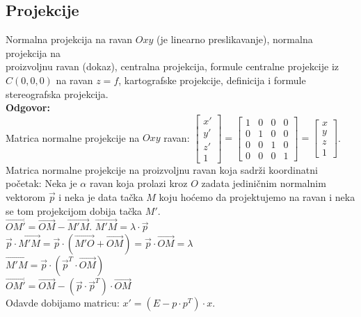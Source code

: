 \documentclass[12pt]{article}
\begin{document}
    \subsection{Projekcije}
    Normalna projekcija na ravan $Oxy$ (je linearno preslikavanje),
    normalna projekcija na \\proizvoljnu ravan (dokaz),
    centralna projekcija, formule centralne projekcije iz
$C(0,0,0)$ na ravan $z=f$, kartografske projekcije,
    definicija i formule stereografska projekcija.
    \\
    \textbf{Odgovor:}\\
    Matrica normalne projekcije na $Oxy$ ravan:
$\begin{bmatrix}
    x' \\
    y' \\
    z' \\
    1
\end{bmatrix}=\begin{bmatrix}
    1 & 0 & 0 & 0 \\
    0 & 1 & 0 & 0 \\
    0 & 0 & 1 & 0 \\
    0 & 0 & 0 & 1
\end{bmatrix}=\begin{bmatrix}
    x \\
    y \\
    z \\
    1
\end{bmatrix}$.\\
    Matrica normalne projekcije na proizvoljnu ravan koja sadrži koordinatni početak:
    Neka je $\alpha$ ravan koja prolazi kroz $O$ zadata jediničnim
    normalnim vektorom $\overrightarrow{p}$ i neka je data tačka $M$
    koju hoćemo da projektujemo na ravan i neka se
    tom projekcijom dobija tačka $M'$.\\
$\overrightarrow{OM'}=\overrightarrow{OM}-\overrightarrow{M'M}$.
$\overrightarrow{M'M}=\lambda\cdot\overrightarrow{p}$\\
$\overrightarrow{p}\cdot\overrightarrow{M'M}=\overrightarrow{p}\cdot(\overrightarrow{M'O}+\overrightarrow{OM})=\overrightarrow{p}\cdot\overrightarrow{OM}=\lambda$\\
$\overrightarrow{M'M}=\overrightarrow{p}\cdot (\overrightarrow{p}^T\cdot\overrightarrow{OM})$\\
$\overrightarrow{OM'}=\overrightarrow{OM}-(\overrightarrow{p}\cdot \overrightarrow{p}^T)\cdot\overrightarrow{OM}$\\
    Odavde dobijamo matricu: $x'=(E-p\cdot p^T)\cdot x$.\\
\end{document}
